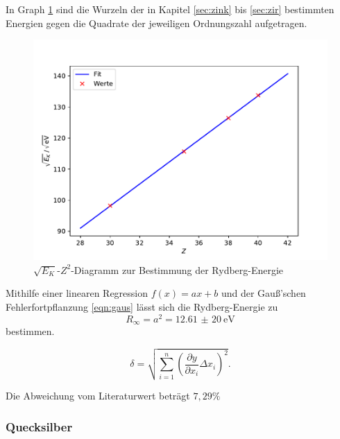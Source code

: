 In Graph \ref{fig:mos} sind die Wurzeln der in Kapitel \ref{sec:zink} bis \ref{sec:zir} bestimmten Energien gegen die Quadrate
der jeweiligen Ordnungszahl aufgetragen.
\begin{figure}[H]
  \centering
  \includegraphics[width=\textwidth]{Plots/moseley.pdf}
  \caption{$\sqrt{E_K}$-$Z^2$-Diagramm zur Bestimmung der Rydberg-Energie}
  \label{fig:mos}
\end{figure}

Mithilfe einer linearen Regression $f(x) = ax+b$ und der Gauß'schen Fehlerfortpflanzung \eqref{eqn:gaus} lässt sich die Rydberg-Energie zu
\begin{equation*}
  R_\infty = a^2 = \SI{12,61(20)}{\eV}
\end{equation*}
bestimmen.

\begin{equation}
   \delta = \sqrt{ \sum_{i=1}^{n}(\frac{\partial y}{\partial x_i} \Delta x_i)^2}.
   \label{eqn:gaus}
 \end{equation}

Die Abweichung vom Literaturwert beträgt $7,29 \%$

\subsubsection{Quecksilber \label{sec:queck}}


